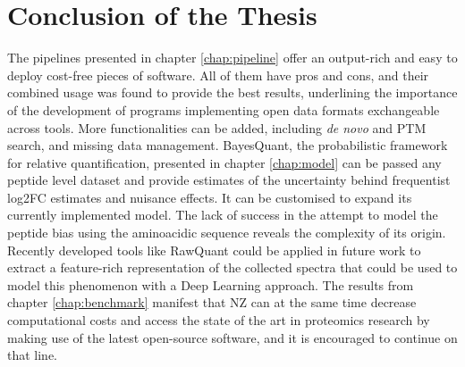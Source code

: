\chapter{Conclusion of the Thesis}
\label{chap:conclusion}

The pipelines presented in chapter \ref{chap:pipeline} offer an output-rich and easy to deploy cost-free pieces of software. All of them have pros and cons, and their combined usage was found to provide the best results, underlining the importance of the development of programs implementing open data formats exchangeable across tools. More functionalities can be added, including \textit{de novo} and \ac{PTM} search, and missing data management. BayesQuant, the probabilistic framework for relative quantification, presented in chapter \ref{chap:model} can be passed any peptide level dataset and provide estimates of the uncertainty behind frequentist \ac{log2FC} estimates and nuisance effects. It can be customised to expand its currently implemented model. The lack of success in the attempt to model the peptide bias using the aminoacidic sequence reveals the complexity of its origin. Recently developed tools like RawQuant could be applied in future work to extract a feature-rich representation of the collected spectra that could be used to model this phenomenon with a Deep Learning approach. The results from chapter \ref{chap:benchmark} manifest that \ac{NZ} can at the same time decrease computational costs and access the state of the art in proteomics research by making use of the latest open-source software, and it is encouraged to continue on that line.